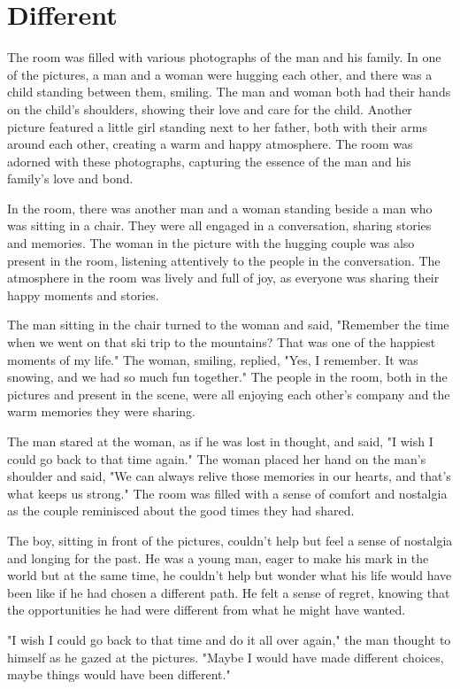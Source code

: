 \documentclass[smalldemyvopaper,11pt,twoside,onecolumn,openright,extrafontsizes]{memoir}
\begin{document}
\chapter{Different}
The room was filled with various photographs of the man and his family. In one of the pictures, a man and a woman were hugging each other, and there was a child standing between them, smiling. The man and woman both had their hands on the child's shoulders, showing their love and care for the child. Another picture featured a little girl standing next to her father, both with their arms around each other, creating a warm and happy atmosphere. The room was adorned with these photographs, capturing the essence of the man and his family's love and bond.\par
In the room, there was another man and a woman standing beside a man who was sitting in a chair. They were all engaged in a conversation, sharing stories and memories. The woman in the picture with the hugging couple was also present in the room, listening attentively to the people in the conversation. The atmosphere in the room was lively and full of joy, as everyone was sharing their happy moments and stories.\par
The man sitting in the chair turned to the woman and said, "Remember the time when we went on that ski trip to the mountains? That was one of the happiest moments of my life." The woman, smiling, replied, "Yes, I remember. It was snowing, and we had so much fun together." The people in the room, both in the pictures and present in the scene, were all enjoying each other's company and the warm memories they were sharing.\par
The man stared at the woman, as if he was lost in thought, and said, "I wish I could go back to that time again." The woman placed her hand on the man's shoulder and said, "We can always relive those memories in our hearts, and that's what keeps us strong." The room was filled with a sense of comfort and nostalgia as the couple reminisced about the good times they had shared.\par
The boy, sitting in front of the pictures, couldn't help but feel a sense of nostalgia and longing for the past. He was a young man, eager to make his mark in the world but at the same time, he couldn't help but wonder what his life would have been like if he had chosen a different path. He felt a sense of regret, knowing that the opportunities he had were different from what he might have wanted.\par
"I wish I could go back to that time and do it all over again," the man thought to himself as he gazed at the pictures. "Maybe I would have made different choices, maybe things would have been different."\par
\end{document}
